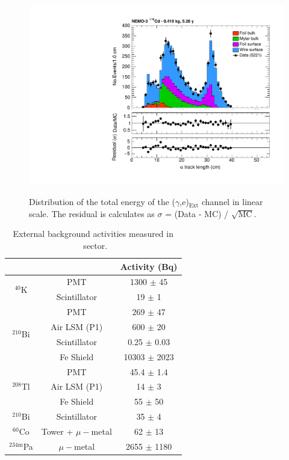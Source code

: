 \documentclass[main.tex]{subfiles}
\begin{document}
\begin{figure}[h!]
\centering
\includegraphics[page=3,scale=0.55]{pictures/Chap6/FinalPlots.pdf}
\label{egChannel_Etot}
\caption{Distribution of the total energy of the ($\gamma$,e)$_{\text{Ext}}$ channel in linear scale. The residual is calculates as $\sigma$ = (Data - MC) / $\sqrt{\text{MC}}$.}
\end{figure}




\begin{table}
\centering
\begin{tabular}{c|c|c}
                                   &              &  Activity (Bq)   \\
\toprule
\multirow{2}{*}{$^{\text{40}}$K}   & PMT          & 1300  $\pm$ 45   \\
                                   & Scintillator & 19    $\pm$ 1    \\
\hline
\multirow{4}{*}{$^{\text{210}}$Bi} & PMT          & 269   $\pm$ 47   \\
                                   & Air LSM (P1) & 600   $\pm$ 20   \\
                                   & Scintillator & 0.25  $\pm$ 0.03 \\
                                   & Fe Shield    & 10303 $\pm$ 2023 \\
\hline
\multirow{3}{*}{$^{\text{208}}$Tl} & PMT          & 45.4   $\pm$ 1.4 \\
                                   & Air LSM (P1) & 14     $\pm$ 3   \\
                                   & Fe Shield    & 55     $\pm$ 50  \\
\hline
$^{\text{210}}$Bi                  & Scintillator & 35     $\pm$ 4  \\
\hline
$^{\text{60}}$Co                   & Tower + $\mu-$metal & 62 $\pm$ 13  \\
\hline
$^{\text{234m}}$Pa                 & $\mu-$metal & 2655 $\pm$ 1180  \\
\bottomrule
\end{tabular}
\caption{External background activities measured in \Cd~sector.}
\label{TableOCE-activityMeasurement}
\end{table}
\end{document}
